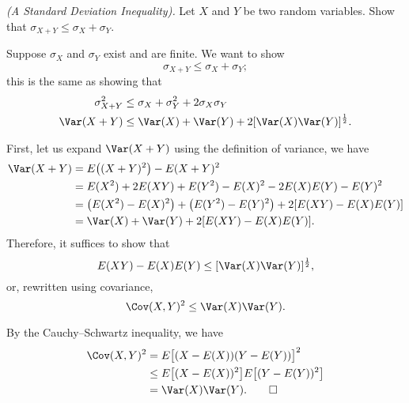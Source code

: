 \begin{problem}[Handout 15, \# 16]
  \emph{(A Standard Deviation Inequality).} Let \(X\) and \(Y\) be two
  random variables. Show that \(\sigma_{X+Y}\leq\sigma_X+\sigma_Y\).
\end{problem}
\begin{solution}
  Suppose \(\sigma_X\) and \(\sigma_Y\) exist and are finite. We want to
  show
  \[
    \sigma_{X+Y}\leq\sigma_X+\sigma_Y;
  \]
  this is the same as showing that
  \begin{align*}
    \sigma_{X+Y}^2
    &\leq\sigma_X+\sigma_Y^2+2\sigma_X\sigma_Y\\
    \Var(X+Y)&\leq\Var(X)+\Var(Y)+2[\Var(X)\Var(Y)]^{\frac{1}{2}}.
  \end{align*}

  First, let us expand \(\Var(X+Y)\) using the definition of variance, we
  have
  \begin{align*}
    \Var(X+Y)
    &=E\bigl((X+Y)^2\bigr)-E(X+Y)^2\\
    &=E(X^2)+2E(XY)+E(Y^2)-E(X)^2-2E(X)E(Y)-E(Y)^2\\
    &=\bigl(E(X^2)-E(X)^2\bigr)+\bigl(E(Y^2)-E(Y)^2\bigr)+2[E(XY)-E(X)E(Y)]\\
    &=\Var(X)+\Var(Y)+2[E(XY)-E(X)E(Y)].
  \end{align*}
  Therefore, it suffices to show that
  \[
    E(XY)-E(X)E(Y)\leq [\Var(X)\Var(Y)]^{\frac{1}{2}},
  \]
  or, rewritten using covariance,
  \[
    \Cov(X,Y)^2\leq\Var(X)\Var(Y).
  \]

  By the Cauchy--Schwartz inequality, we have
  \begin{align*}
    \Cov(X,Y)^2
    &=E\bigl[(X-E(X))(Y-E(Y))\bigr]^2\\
    &\leq E\bigl[(X-E(X))^2\bigr]
      E\bigl[(Y-E(Y))^2\bigr]\\
    &=\Var(X)\Var(Y).\qedhere
  \end{align*}
\end{solution}
\newpage

